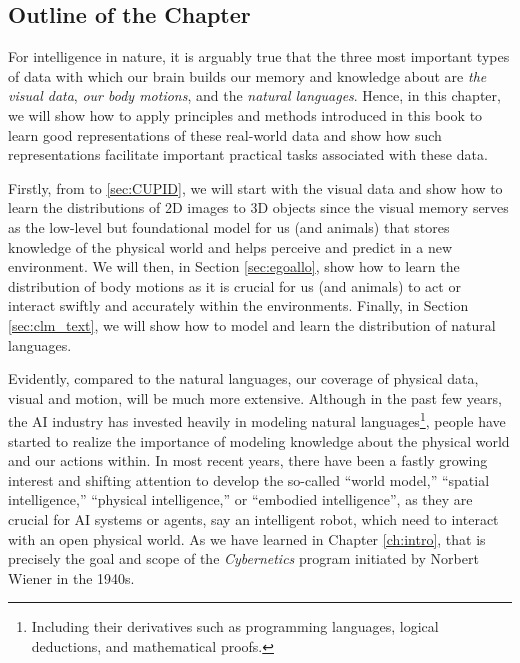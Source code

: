 \documentclass[../../book-main.tex]{subfiles}
\begin{document}
\subsection{Outline of the Chapter}
\label{sec:application_outline}
For intelligence in nature, it is arguably true that the three most
important types of data with which our brain builds our memory and
knowledge about are {\em the visual data}, {\em our body motions},
and the {\em natural languages}. Hence, in this chapter, we will show
how to apply principles and methods introduced in this book to learn
good representations of these real-world data and show how such
representations facilitate important practical tasks associated with these data.

Firstly, from  to
\ref{sec:CUPID}, we will start with the visual data and show how to
learn the distributions of 2D images to 3D objects since the visual
memory serves as the low-level but foundational model for us (and
animals) that stores knowledge of the physical world and helps
perceive and predict in a new environment. We will then, in Section
\ref{sec:egoallo}, show how to learn the distribution of body motions
as it is crucial for us (and animals) to act or interact swiftly and
accurately within the environments. Finally, in Section
\ref{sec:clm_text}, we will show how to model and learn the
distribution of natural languages.

Evidently, compared to the natural languages, our coverage of
physical data, visual and motion, will be much more extensive.
Although in the past few years, the AI industry has invested heavily
in modeling natural languages\footnote{Including their derivatives
    such as programming languages, logical deductions, and mathematical
proofs.}, people have started to realize the importance of modeling
knowledge about the physical world and our actions within. In most
recent years, there have been a fastly growing interest and shifting
attention to develop the so-called ``world model,'' ``spatial
intelligence,'' ``physical intelligence,'' or ``embodied
intelligence'', as they are crucial for AI systems or agents, say an
intelligent robot, which need to interact with an open physical
world. As we have learned in Chapter \ref{ch:intro}, that is
precisely the goal and scope of the {\em  Cybernetics} program
initiated by Norbert Wiener in the 1940s.
\end{document}
